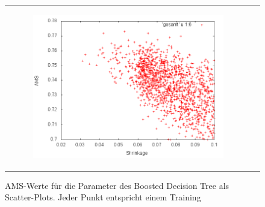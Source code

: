\begin{figure}[!t]
\begin{tabular}[b]{cc}
  	  \begin{subfigure}[b]{0.5\linewidth}
	   	\includegraphics[width=\linewidth]{sections/parameter_optimization_bdt/Shrinkage.png}
 		\caption[]{}
		\label{fig:bdt_Shrinkage}
  	  \end{subfigure} &
  \end{tabular}
  \caption[]{AMS-Werte für die Parameter des Boosted Decision Tree als Scatter-Plots. Jeder Punkt entspricht einem Training}
  \label{fig:AMS-distribution-plots}
\end{figure}